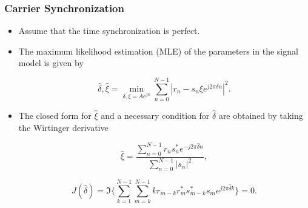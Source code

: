 \begin{frame}
  \frametitle{Carrier Synchronization}
    \begin{itemize}
    
       \item Assume that the time synchronization is perfect.
       \item The maximum likelihood estimation (MLE) of the parameters in the signal model is given by
       
       \begin{equation}
        \label{eq:ML_f_xi}
        \hat{\delta},\hat{\xi}=\min_{\delta,\xi=Ae^{j\phi}}\sum_{n=0}^{N-1}|r_n-s_n\xi e^{j2\pi\delta n}|^{2}.
      \end{equation}

      \item The closed form for $\hat{\xi}$ and a necessary condition for $\hat{\delta}$ are obtained by taking the Wirtinger derivative
      
      \begin{equation}
        \label{eq:opt_xi}
        \hat{\xi}=\frac{\sum_{n=0}^{N-1}{r_{n}s_n^{*}e^{-j2\pi\hat{\delta} n}}}{\sum_{n=0}^{N-1}|s_{n}|^2},
      \end{equation}

      \begin{equation}
        \label{eq:necessary condition for delta}
        J(\hat{\delta}) = \Im\bigg\{\sum_{k=1}^{N-1}{\sum_{m=k}^{N-1}{kr_{m-k}r_m^{*}s_{m-k}^{*}s_m}e^{j2\pi\hat{\delta}k}}\bigg\}=0.
      \end{equation}

    \end{itemize}


\end{frame}


